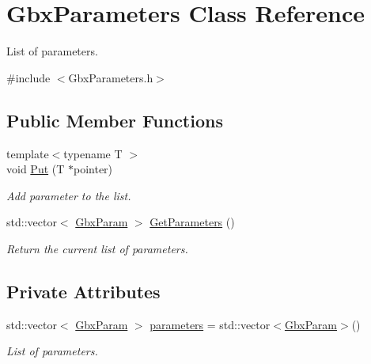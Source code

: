 \hypertarget{classGbxParameters}{\section{Gbx\-Parameters Class Reference}
\label{classGbxParameters}
}


List of parameters.  




{\ttfamily \#include $<$Gbx\-Parameters.\-h$>$}

\subsection*{Public Member Functions}
\begin{DoxyCompactItemize}
\item 
{\footnotesize template$<$typename T $>$ }\\void \hyperlink{classGbxParameters_a2cf83794717cf9fdc13e5ff12e259f04}{Put} (T $\ast$pointer)
\begin{DoxyCompactList}\small\item\em Add parameter to the list. \end{DoxyCompactList}\item 
\hypertarget{classGbxParameters_a09302bc40359205cd294b8bcf2ab1c2e}{std\-::vector$<$ \hyperlink{structGbxParam}{Gbx\-Param} $>$ \hyperlink{classGbxParameters_a09302bc40359205cd294b8bcf2ab1c2e}{Get\-Parameters} ()}\label{classGbxParameters_a09302bc40359205cd294b8bcf2ab1c2e}

\begin{DoxyCompactList}\small\item\em Return the current list of parameters. \end{DoxyCompactList}\end{DoxyCompactItemize}
\subsection*{Private Attributes}
\begin{DoxyCompactItemize}
\item 
\hypertarget{classGbxParameters_aeabcb21396d3198d718c94de23595750}{std\-::vector$<$ \hyperlink{structGbxParam}{Gbx\-Param} $>$ \hyperlink{classGbxParameters_aeabcb21396d3198d718c94de23595750}{parameters} = std\-::vector$<$\hyperlink{structGbxParam}{Gbx\-Param}$>$()}\label{classGbxParameters_aeabcb21396d3198d718c94de23595750}

\begin{DoxyCompactList}\small\item\em List of parameters. \end{DoxyCompactList}\end{DoxyCompactItemize}


